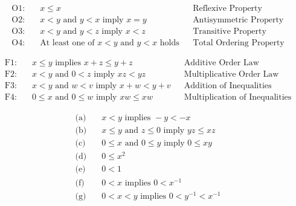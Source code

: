 \documentclass[
	12pt, %
	fleqn, %
	a4paper, %
]{LegrandOrangeBook}
\begin{document}
\begin{proposition}
\begin{align*}
    \text{O1:} &\quad x \leq x && \text{Reflexive Property} \\
    \text{O2:} &\quad x < y \text{ and } y < x \text{ imply } x = y && \text{Antisymmetric Property} \\
    \text{O3:} &\quad x < y \text{ and } y < z \text{ imply } x < z && \text{Transitive Property} \\
    \text{O4:} &\quad \text{At least one of } x < y \text{ and } y < x \text{ holds} && \text{Total Ordering Property}
\end{align*}
\end{proposition}

\begin{proposition}
\begin{align*}
    \text{F1:} &\quad x \leq y \text{ implies } x + z \leq y + z && \text{Additive Order Law} \\
    \text{F2:} &\quad x < y \text{ and } 0 < z \text{ imply } xz < yz && \text{Multiplicative Order Law} \\
    \text{F3:} &\quad x < y \text{ and } w < v \text{ imply } x + w < y + v && \text{Addition of Inequalities} \\
    \text{F4:} &\quad 0 \leq x \text{ and } 0 \leq w \text{ imply } xw \leq xw && \text{Multiplication of Inequalities}
\end{align*}
\end{proposition}

\begin{proposition}
\begin{align*}
    \text{(a)} &\quad x < y \text{ implies } -y < -x \\
    \text{(b)} &\quad x \leq y \text{ and } z \leq 0 \text{ imply } yz \leq xz \\
    \text{(c)} &\quad 0 \leq x \text{ and } 0 \leq y \text{ imply } 0 \leq xy \\
    \text{(d)} &\quad 0 \leq x^2 \\
    \text{(e)} &\quad 0 < 1 \\
    \text{(f)} &\quad 0 < x \text{ implies } 0 < x^{-1} \\
    \text{(g)} &\quad 0 < x < y \text{ implies } 0 < y^{-1} < x^{-1}
\end{align*}
\end{proposition}
\end{document}
